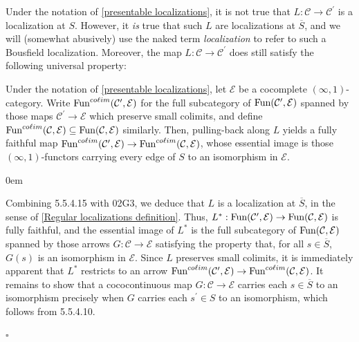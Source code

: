 \documentclass[10pt]{article}
\newcommand{\C}{\mathcal C}
\newcommand{\cE}{\mathcal{E}}
\renewcommand{\qed}{\hfill$\square$}
\renewenvironment{proof}{\begin{addmargin}[1em]{0em}\begin{newproof}}{\end{newproof}\end{addmargin}\qed}
\theoremstyle{witharg}
\theoremstyle{witharg}
\theoremstyle{witharg2}
\begin{document}
\noindent Under the notation of \ref{presentable localizations}, it is not true that $L:\C\rightarrow \C^\prime$ is a localization at $S$. However, it \emph{is} true that such $L$ are localizations at $\overline{S}$, and we will (somewhat abusively) use the naked term \emph{localization} to refer to such a Bousfield localization. Moreover, the map $L:\C\rightarrow \C^\prime$ does still satisfy the following universal property: 

\begin{lemma}{}\label{Univ property of Presentable Localizations}

    Under the notation of \ref{presentable localizations}, let $\cE$ be a cocomplete $(\infty,1)$-category. Write $\textnormal{Fun}^{co\ell im}(\C^\prime,\cE)$ for the full subcategory of $\textnormal{Fun}(\C^\prime,\cE)$ spanned by those maps $\C^\prime\rightarrow \cE$ which preserve small colimits, and define $\textnormal{Fun}^{co\ell im}(\C,\cE)\subseteq \textnormal{Fun}(\C,\cE)$ similarly. Then, pulling-back along $L$ yields a fully faithful map $\textnormal{Fun}^{co\ell im}(\C^\prime,\cE)\rightarrow \textnormal{Fun}^{co\ell im}(\C,\cE)$, whose essential image is those $(\infty,1)$-functors carrying every edge of $S$ to an isomorphism in $\cE$.
    
\end{lemma}

\begin{proof}

    Combining  5.5.4.15 with  02G3, we deduce that $L$ is a localization at $\overline{S}$, in the sense of \ref{Regular localizations definition}. Thus, $L^*:\textnormal{Fun}(\C^\prime,\cE)\rightarrow \textnormal{Fun}(\C,\cE)$ is fully faithful, and the essential image of $L^*$ is the full subcategory of $\textnormal{Fun}(\C,\cE)$ spanned by those arrows $G:\C\rightarrow \cE$ satisfying the property that, for all $s\in \overline{S}$, $G(s)$ is an isomorphism in $\cE$. Since $L$ preserves small colimits, it is immediately apparent that $L^*$ restricts to an arrow $\textnormal{Fun}^{co\ell im}(\C^\prime,\cE)\rightarrow \textnormal{Fun}^{co\ell im}(\C,\cE)$. It remains to show that a cococontinuous map $G:\C\rightarrow \cE$ carries each $s\in \overline{S}$ to an isomorphism precisely when $G$ carries each $s^\prime\in S$ to an isomorphism, which follows from  5.5.4.10.

\end{proof}
\end{document}
